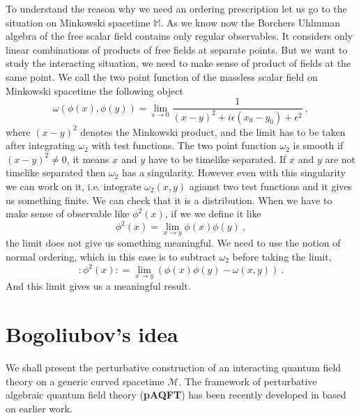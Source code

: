 \documentclass[10pt]{book}
\newcommand{\Mcal}{\mathcal{M}}
\newcommand{\Mbb}{\mathbb{M}}
\theoremstyle{break}
\begin{document}
To understand the reason why we need an ordering prescription let us go to the situation on Minkowski spacetime $\Mbb$. As we know now the Borchers Uhlmman algebra of the free scalar field contains only regular observables. It considers only linear combinations of products of free fields at separate points. But we want to study the interacting situation, we need to make sense of product of fields at the same point. We call the two point function of the massless scalar field on Minkowski spacetime the following object
%
\begin{equation}
\omega(\phi(x),\phi(y)) = \lim_{\epsilon \to 0} \frac{1}{(x-y)^2 + i \epsilon (x_0-y_0) + \epsilon^2} \ , 
\end{equation}
%
where $(x-y)^2$ denotes the Minkowski product, and the limit has to be taken after integrating $\omega_2$ with test functions. The two point function $\omega_2$ is smooth if $(x-y)^2 \neq 0$, it means $x$ and $y$ have to be timelike separated. If $x$ and $y$ are not timelike separated then $\omega_2$ has a singularity. However even with this singularity we can work on it, i.e. integrate $\omega_2(x,y)$ agianst two test functions and it gives us something finite. We can check that it is a distribution. When we have to make sense of observable like $\phi^2(x)$, if we we define it like
%
\begin{equation*}
\phi^2(x) = \lim_{x \to y} \phi(x) \phi(y) \ ,
\end{equation*}
%
the limit does not give us something meaningful. We need to use the notion of normal ordering, which in this case is to subtract $\omega_2$ before taking the limit,
%
\begin{equation*}
:\phi^2(x): = \lim_{x \to y} \left( \phi(x) \phi(y) - \omega(x,y) \right) \ .
\end{equation*}
%
And this limit gives us a meaningful result.






\section{Bogoliubov's idea}


We shall present the perturbative construction of an interacting quantum field theory on a generic curved spacetime $\Mcal$. The framework of perturbative algebraic quantum field theory (\textbf{pAQFT}) has been recently developed in \cite{brunetti_perturbative_2009,fredenhagen_perturbative_2015,fredenhagen_batalin-vilkovisky_2013} based on earlier work.
\end{document}
